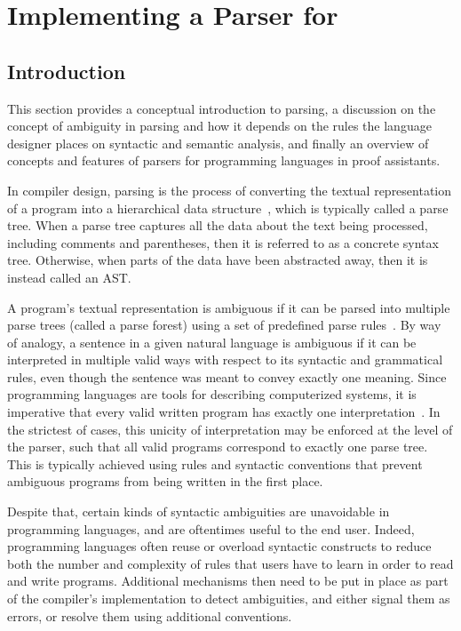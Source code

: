 \chapter{Implementing a Parser for \Beluga}

\section{Introduction}

This section provides a conceptual introduction to parsing, a discussion on the concept of ambiguity in parsing and how it depends on the rules the language designer places on syntactic and semantic analysis, and finally an overview of concepts and features of parsers for programming languages in proof assistants.


In compiler design, parsing is the process of converting the textual representation of a program into a hierarchical data structure~\cite{aho2007compilers, afroozeh2019practical}, which is typically called a parse tree.
When a parse tree captures all the data about the text being processed, including comments and parentheses, then it is referred to as a concrete syntax tree.
Otherwise, when parts of the data have been abstracted away, then it is instead called an \ac{AST}.


A program's textual representation is ambiguous if it can be parsed into multiple parse trees (called a parse forest) using a set of predefined parse rules~\cite{aho2007compilers}.
By way of analogy, a sentence in a given natural language is ambiguous if it can be interpreted in multiple valid ways with respect to its syntactic and grammatical rules, even though the sentence was meant to convey exactly one meaning.
Since programming languages are tools for describing computerized systems, it is imperative that every valid written program has exactly one interpretation~\cite{aho2007compilers}.
In the strictest of cases, this unicity of interpretation may be enforced at the level of the parser, such that all valid programs correspond to exactly one parse tree.
This is typically achieved using rules and syntactic conventions that prevent ambiguous programs from being written in the first place.

Despite that, certain kinds of syntactic ambiguities are unavoidable in programming languages, and are oftentimes useful to the end user.
Indeed, programming languages often reuse or overload syntactic constructs to reduce both the number and complexity of rules that users have to learn in order to read and write programs.
Additional mechanisms then need to be put in place as part of the compiler's implementation to detect ambiguities, and either signal them as errors, or resolve them using additional conventions.

